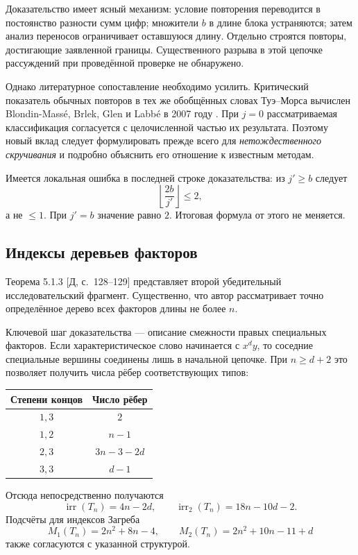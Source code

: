 \documentclass[12pt,a4paper]{article}
\newcommand{\irr}{\operatorname{irr}}
\newcommand{\sref}[1]{\textnormal{[Д, с.~#1]}}
\begin{document}
Доказательство имеет ясный механизм: условие повторения переводится
в постоянство разности сумм цифр; множители $b$ в длине блока
устраняются; затем анализ переносов ограничивает оставшуюся длину.
Отдельно строятся повторы, достигающие заявленной границы.
Существенного разрыва в этой цепочке рассуждений при проведённой
проверке не обнаружено.

Однако литературное сопоставление необходимо усилить. Критический
показатель обычных повторов в тех же обобщённых словах Туэ--Морса
вычислен Blondin-Massé, Brlek, Glen и Labbé в 2007 году
\cite{blondin}. При $j=0$ рассматриваемая классификация согласуется
с целочисленной частью их результата. Поэтому новый вклад следует
формулировать прежде всего для \emph{нетождественного скручивания}
и подробно объяснить его отношение к известным методам.

Имеется локальная ошибка в последней строке доказательства:
из $j'\ge b$ следует
\[
  \left\lfloor\frac{2b}{j'}\right\rfloor\le2,
\]
а не $\le1$. При $j'=b$ значение равно $2$.
Итоговая формула от этого не меняется.

\subsection{Индексы деревьев факторов}

Теорема 5.1.3 \sref{128--129} представляет второй убедительный
исследовательский фрагмент. Существенно, что автор рассматривает точно
определённое дерево всех факторов длины не более $n$.

Ключевой шаг доказательства --- описание смежности правых специальных
факторов. Если характеристическое слово начинается с $x^dy$, то соседние
специальные вершины соединены лишь в начальной цепочке. При $n\ge d+2$
это позволяет получить числа рёбер соответствующих типов:

\begin{center}
\begin{tabular}{@{}cc@{}}
\toprule
\textbf{Степени концов} & \textbf{Число рёбер}\\
\midrule
$1,3$ & $2$\\
$1,2$ & $n-1$\\
$2,3$ & $3n-3-2d$\\
$3,3$ & $d-1$\\
\bottomrule
\end{tabular}
\end{center}

Отсюда непосредственно получаются
\[
  \irr(T_n)=4n-2d,\qquad
  \irr_2(T_n)=18n-10d-2.
\]
Подсчёты для индексов Загреба
\[
  M_1(T_n)=2n^2+8n-4,\qquad
  M_2(T_n)=2n^2+10n-11+d
\]
также согласуются с указанной структурой.
\end{document}
